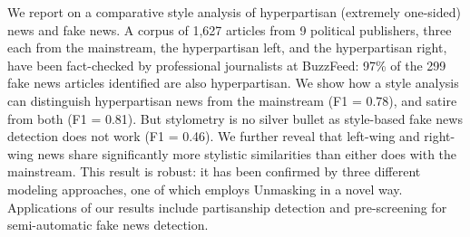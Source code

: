 We report on a comparative style analysis of hyperpartisan (extremely one-sided) news and fake news. A corpus of 1,627 articles from 9 political publishers, three each from the mainstream, the hyperpartisan left, and the hyperpartisan right, have been fact-checked by professional journalists at BuzzFeed: 97\% of the 299 fake news articles identified are also hyperpartisan. We show how a style analysis can distinguish hyperpartisan news from the mainstream (F1 = 0.78), and satire from both (F1 = 0.81). But stylometry is no silver bullet as style-based fake news detection does not work (F1 = 0.46). We further reveal that left-wing and right-wing news share significantly more stylistic similarities than either does with the mainstream. This result is robust: it has been confirmed by three different modeling approaches, one of which employs Unmasking in a novel way. Applications of our results include partisanship detection and pre-screening for semi-automatic fake news detection.
